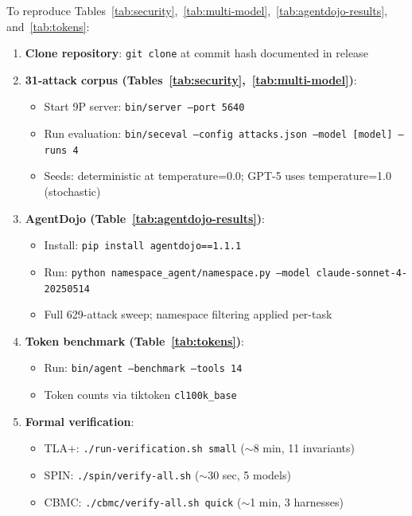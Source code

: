 \documentclass[acmsmall,screen,review]{acmart}
\begin{document}
To reproduce Tables~\ref{tab:security},~\ref{tab:multi-model},~\ref{tab:agentdojo-results}, and~\ref{tab:tokens}:

\begin{enumerate}
    \item \textbf{Clone repository}: \texttt{git clone} at commit hash documented in release
    \item \textbf{31-attack corpus (Tables~\ref{tab:security},~\ref{tab:multi-model})}:
    \begin{itemize}
        \item Start 9P server: \texttt{bin/server --port 5640}
        \item Run evaluation: \texttt{bin/seceval --config attacks.json --model [model] --runs 4}
        \item Seeds: deterministic at temperature=0.0; GPT-5 uses temperature=1.0 (stochastic)
    \end{itemize}
    \item \textbf{AgentDojo (Table~\ref{tab:agentdojo-results})}:
    \begin{itemize}
        \item Install: \texttt{pip install agentdojo==1.1.1}
        \item Run: \texttt{python namespace\_agent/namespace.py --model claude-sonnet-4-20250514}
        \item Full 629-attack sweep; namespace filtering applied per-task
    \end{itemize}
    \item \textbf{Token benchmark (Table~\ref{tab:tokens})}:
    \begin{itemize}
        \item Run: \texttt{bin/agent --benchmark --tools 14}
        \item Token counts via tiktoken \texttt{cl100k\_base}
    \end{itemize}
    \item \textbf{Formal verification}:
    \begin{itemize}
        \item TLA+: \texttt{./run-verification.sh small} ($\sim$8 min, 11 invariants)
        \item SPIN: \texttt{./spin/verify-all.sh} ($\sim$30 sec, 5 models)
        \item CBMC: \texttt{./cbmc/verify-all.sh quick} ($\sim$1 min, 3 harnesses)
    \end{itemize}
\end{enumerate}
\end{document}
